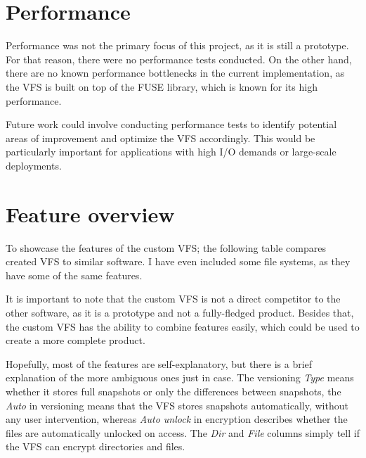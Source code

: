 \section{Performance}\label{sec:performance}

Performance was not the primary focus of this project, as it is still a prototype.
For that reason, there were no performance tests conducted.
On the other hand, there are no known performance bottlenecks in the current implementation, as the VFS is built on top of the FUSE library, which is known for its high performance.

Future work could involve conducting performance tests to identify potential areas of improvement and optimize the VFS accordingly.
This would be particularly important for applications with high I/O demands or large-scale deployments.


\section{Feature overview}\label{sec:feature-overview}

To showcase the features of the custom VFS; the following table compares created VFS to similar software.
I have even included some file systems, as they have some of the same features.

It is important to note that the custom VFS is not a direct competitor to the other software, as it is a prototype and not a fully-fledged product.
Besides that, the custom VFS has the ability to combine features easily, which could be used to create a more complete product.

Hopefully, most of the features are self-explanatory, but there is a brief explanation of the more ambiguous ones just in case.
The versioning \textit{Type} means whether it stores full snapshots or only the differences between snapshots,
the \textit{Auto} in versioning means that the VFS stores snapshots automatically, without any user intervention, whereas
\textit{Auto unlock} in encryption describes whether the files are automatically unlocked on access.
The \textit{Dir} and \textit{File} columns simply tell if the VFS can encrypt directories and files.

\clearpage

\renewcommand{\checkmark}{\tikz\fill[scale=0.4](0,.35) -- (.25,0) -- (1,.7) -- (.25,.15) -- cycle;}

